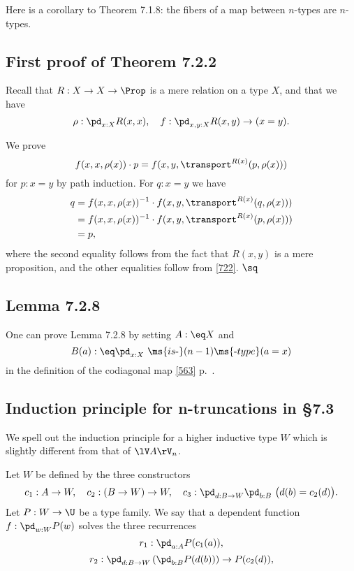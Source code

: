 \documentclass[12pt]{article}
\begin{document}
Here is a corollary to Theorem 7.1.8: the fibers of a map between $n$-types are $n$-types.


\subsection{First proof of Theorem 7.2.2}

Recall that $R:X\to X\to\Prop$ is a mere relation on a type $X$, and that we have 
$$
\rho:\pd_{x:X}R(x,x),\quad f:\pd_{x,y:X}R(x,y)\to(x=y).
$$ 

We prove 
\begin{equation}\label{722}
f(x,x,\rho(x))\cdot p=f(x,y,\transport^{R(x)}(p,\rho(x)))
\end{equation}  
for $p:x=y$ by path induction. For $q:x=y$ we have 
\begin{align*}
q&=f(x,x,\rho(x))^{-1}\cdot f(x,y,\transport^{R(x)}(q,\rho(x)))\\
&=f(x,x,\rho(x))^{-1}\cdot f(x,y,\transport^{R(x)}(p,\rho(x)))\\
&=p,
\end{align*} 
where the second equality follows from the fact that $R(x,y)$ is a mere proposition, and the other equalities follow from \eqref{722}. $\sq$


\subsection{Lemma 7.2.8}

One can prove Lemma 7.2.8 by setting $A:\eq X$ and 
$$
B(a):\eq\pd_{x:X}\ \ms{is\text-}(n-1)\ms{\text-type}(a=x)
$$ 
in the definition of the codiagonal map \eqref{563} p.~\pageref{563}.


\subsection{Induction principle for n-truncations in \S7.3}

We spell out the induction principle for a higher inductive type $W$ which is slightly different from that of $\lV A\rV_n$.

Let $W$ be defined by the three constructors 
$$
c_1:A\to W,\quad c_2:(B\to W)\to W,\quad c_3:\pd_{d:B\to W}\pd_{b:B}\ \big(d(b)=c_2(d)\big).
$$ 
Let $P:W\to\U$ be a type family. We say that a dependent function $f:\pd_{w:W}P(w)$ solves the three recurrences 
$$
r_1:\pd_{a:A}P(c_1(a)),
$$ 
$$
r_2:\pd_{d:B\to W}\left(\pd_{b:B}P(d(b))\right)\to P(c_2(d)),
$$
\end{document}
